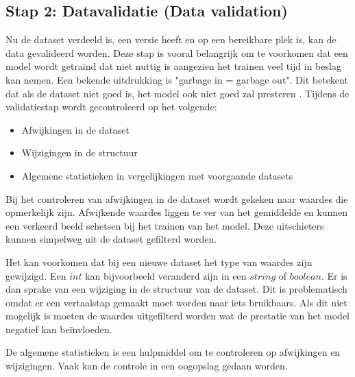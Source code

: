 \subsection{Stap 2: Datavalidatie (Data validation)}\label{subsec:ch4-data-validatie}
Nu de dataset verdeeld is, een versie heeft en op een bereikbare plek is, kan de data gevalideerd worden. Deze stap is vooral belangrijk om te voorkomen dat een model wordt getraind dat niet nuttig is aangezien het trainen veel tijd in beslag kan nemen. Een bekende uitdrukking is "garbage in = garbage out". Dit betekent dat als de dataset niet goed is, het model ook niet goed zal presteren \cite[p.~43]{building-machine-learning-pipelines-oreilly}. Tijdens de validatiestap wordt gecontroleerd op het volgende:

\begin{itemize}
  \item Afwijkingen in de dataset
  \item Wijzigingen in de structuur
  \item Algemene statistieken in vergelijkingen met voorgaande datasets \cite[p.~44]{building-machine-learning-pipelines-oreilly}
\end{itemize}

Bij het controleren van afwijkingen in de dataset wordt gekeken naar waardes die opmerkelijk zijn. Afwijkende waardes liggen te ver van het gemiddelde en kunnen een verkeerd beeld schetsen bij het trainen van het model. Deze uitschieters kunnen simpelweg uit de dataset gefilterd worden.

Het kan voorkomen dat bij een nieuwe dataset het type van waardes zijn gewijzigd. Een \(int\) kan bijvoorbeeld veranderd zijn in een \(string\) of \(boolean\). Er is dan sprake van een wijziging in de structuur van de dataset. Dit is problematisch omdat er een vertaalstap gemaakt moet worden naar iets bruikbaars. Als dit niet mogelijk is moeten de waardes uitgefilterd worden wat de prestatie van het model negatief kan beïnvloeden.

De algemene statistieken is een hulpmiddel om te controleren op afwijkingen en wijzigingen. Vaak kan de controle in een oogopslag gedaan worden. 



